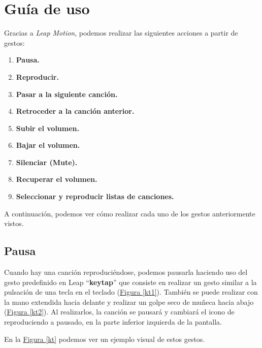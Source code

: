 \documentclass[10pt,a4paper,spanish]{article}
\begin{document}
\section{\textcolor{verde}Guía de uso}

Gracias a \textit{\textcolor{verde}{Leap Motion}}, podemos realizar las siguientes acciones a partir de gestos:

\begin{enumerate}
  \item \textbf{\textcolor{verde}{Pausa.}}
  \item \textbf{\textcolor{verde}{Reproducir.}}
  \item \textbf{\textcolor{verde}{Pasar a la siguiente canción.}}
  \item \textbf{\textcolor{verde}{Retroceder a la canción anterior.}}
  \item \textbf{\textcolor{verde}{Subir el volumen.}}
  \item \textbf{\textcolor{verde}{Bajar el volumen.}}
  \item \textbf{\textcolor{verde}{Silenciar (Mute).}}
  \item \textbf{\textcolor{verde}{Recuperar el volumen.}}
  \item \textbf{\textcolor{verde}{Seleccionar y reproducir listas de canciones.}}
\end{enumerate}

A continuación, podemos ver cómo realizar cada uno de los gestos anteriormente vistos.

\subsection{\textcolor{verde}Pausa}

Cuando hay una canción reproduciéndose, podemos pausarla haciendo uso del gesto predefinido en Leap ``\textbf{\textcolor{verde}{keytap}}'' que consiste en realizar un gesto similar a la pulsación de una tecla en el teclado (\hyperref[kt1]{Figura \ref*{kt1}}). También se puede realizar con la mano extendida hacia delante y realizar un golpe seco de muñeca hacia abajo (\hyperref[kt2]{Figura \ref*{kt2}}). Al realizarlos, la canción se pausará y cambiará el icono de reproduciendo a pausado, en la parte inferior izquierda de la pantalla.

En la \hyperref[kt]{Figura \ref*{kt}} podemos ver un ejemplo visual de estos gestos.
\end{document}
